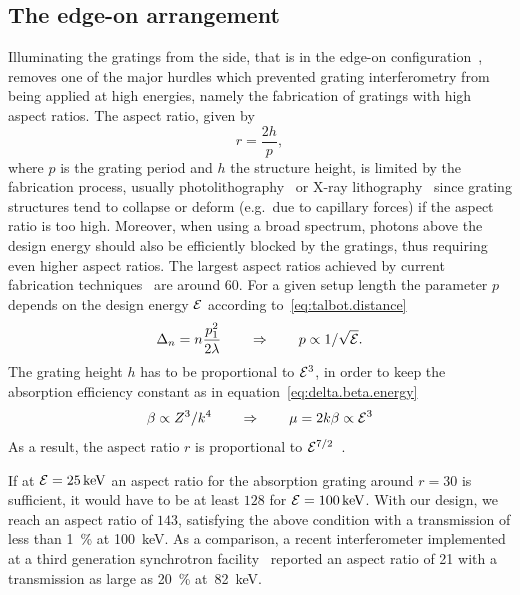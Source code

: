\subsection{The edge-on arrangement}\label{sec:edge-on-arrangement}
Illuminating the gratings from the side, that is in the edge-on
configuration~\parencite{david2014method}, removes one of the major hurdles which prevented grating interferometry from
being applied at high energies, namely the fabrication of gratings
with high aspect ratios. The aspect ratio, given by
\begin{equation}
    r = \frac{2h}{p},
\end{equation}
where $p$ is the
grating period and $h$ the  structure height, is limited by the
fabrication process, usually photolithography~\parencite{David2002} or X-ray
lithography~\parencite{Mohr2012} since grating structures tend to collapse or deform
(e.g.\ due to capillary forces) if the aspect ratio is too high.
Moreover, when using a broad spectrum, photons above the design energy
should also be efficiently blocked by the gratings, thus requiring even
higher aspect ratios. The largest aspect ratios achieved by current
fabrication techniques~\parencite{David2007,Kenntner2010} are around 60.
For a given setup length the parameter $p$ depends on the design energy
$\mathcal{E}$ according to~\eqref{eq:talbot.distance}
\begin{equation}
    \Delta_n = n \frac{p_1^2}{2 \lambda} \qquad \Rightarrow \qquad p \propto 1/\sqrt{\mathcal{E}}.\label{eq:period.energy}
\end{equation}
The grating height $h$ has to be proportional to $\mathcal{E}^3$, in order to
keep the absorption efficiency constant as in
equation~\eqref{eq:delta.beta.energy}
\begin{equation}
    \beta \propto Z^3 / k^4 \qquad \Rightarrow \qquad \mu = 2k\beta \propto
    \mathcal{E}^3
    \label{eq:absorption.energy}
\end{equation}
As a result, the aspect ratio $r$ is proportional to $\mathcal{E}^{7/2}$~\parencite{Momose2003a}.

If at $\mathcal{E}=\SI{25}{\kilo\electronvolt}$ an aspect ratio for the
absorption grating around $r=30$ is sufficient, it would have
to be at least $\num{128}$ for $\energy=\SI{100}{\kilo\eV}$. With our
design, we reach an aspect ratio of $\num{143}$, satisfying the above
condition with a transmission of less than \SI{1}{\percent} at
\SI{100}{\kilo\eV}. As a comparison, a recent interferometer implemented at
a third generation synchrotron facility~\parencite{Willner2013} reported an
aspect ratio of \num{21} with a transmission as large as \SI{20}{\percent}
at~\SI{82}{\kilo\eV}.

